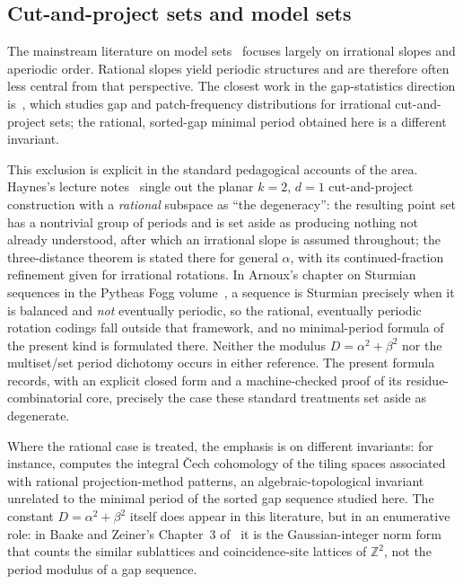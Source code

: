 \documentclass[11pt,reqno]{amsart}
\theoremstyle{plain}
\theoremstyle{definition}
\theoremstyle{remark}
\begin{document}
\subsection{Cut-and-project sets and model sets}

The mainstream literature on model sets~\cite{BaakeGrimm2013,
BaakeGrimm2017, Senechal1995, Meyer1972, HaynesEtAl2016} focuses largely
on irrational slopes and aperiodic order.
Rational slopes yield periodic structures and are therefore often less
central from that perspective.  The closest work in the gap-statistics
direction is~\cite{HaynesEtAl2016}, which studies gap and patch-frequency
distributions for irrational cut-and-project sets; the rational,
sorted-gap minimal period obtained here is a different invariant.

This exclusion is explicit in the standard pedagogical accounts of the area.
Haynes's lecture notes~\cite{HaynesNotes} single out the planar \(k=2\),
\(d=1\) cut-and-project construction with a \emph{rational} subspace as
``the degeneracy'': the resulting point set has a nontrivial group of periods
and is set aside as producing nothing not already understood, after which an
irrational slope is assumed throughout; the three-distance theorem is stated
there for general \(\alpha\), with its continued-fraction refinement given for
irrational rotations.  In Arnoux's chapter on Sturmian sequences in the Pytheas
Fogg volume~\cite{PytheasFogg2002}, a sequence is Sturmian precisely when it is
balanced and \emph{not} eventually periodic, so the rational, eventually
periodic rotation codings fall outside that framework, and no minimal-period
formula of the present kind is formulated there.  Neither the modulus
\(D = \alpha^2+\beta^2\) nor the multiset/set period dichotomy occurs in
either reference.  The
present formula records, with an explicit closed form and a machine-checked
proof of its residue-combinatorial core, precisely the case these standard
treatments set aside as degenerate.

Where the rational case is treated, the emphasis is on different invariants:
for instance, \cite{GaehlerHuntonKellendonk2013} computes the integral
\v{C}ech cohomology of the tiling spaces associated with rational
projection-method patterns, an algebraic-topological invariant unrelated to
the minimal period of the sorted gap sequence studied here.  The constant
\(D = \alpha^2+\beta^2\) itself does appear in this literature, but in an
enumerative role: in Baake and Zeiner's Chapter~3 of~\cite{BaakeGrimm2017} it is
the Gaussian-integer norm form that counts the similar sublattices and
coincidence-site lattices of \(\mathbb{Z}^2\), not the period modulus of a gap
sequence.
\end{document}
